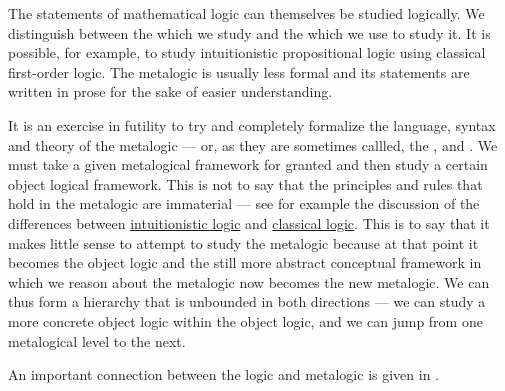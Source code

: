 \begin{remark}\label{rem:metalogic}
  The statements of mathematical logic can themselves be studied logically. We distinguish between the  which we study and the  which we use to study it. It is possible, for example, to study intuitionistic propositional logic using classical first-order logic. The metalogic is usually less formal and its statements are written in prose for the sake of easier understanding.

  It is an exercise in futility to try and completely formalize the language, syntax and theory of the metalogic --- or, as they are sometimes callled, the ,  and . We must take a given metalogical framework for granted and then study a certain object logical framework. This is not to say that the principles and rules that hold in the metalogic are immaterial --- see for example the discussion of the differences between \hyperref[rem:intuitionistic_logic]{intuitionistic logic} and \hyperref[rem:classical_logic]{classical logic}. This is to say that it makes little sense to attempt to study the metalogic because at that point it becomes the object logic and the still more abstract conceptual framework in which we reason about the metalogic now becomes the new metalogic. We can thus form a hierarchy that is unbounded in both directions --- we can study a more concrete object logic within the object logic, and we can jump from one metalogical level to the next.

  An important connection between the logic and metalogic is given in .
\end{remark}

